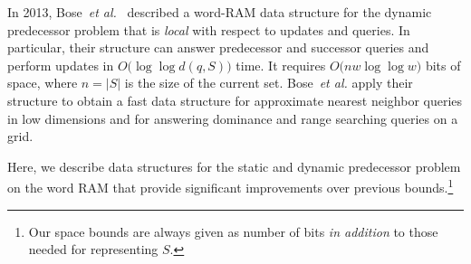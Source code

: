\documentclass[a4paper,11pt]{article}
\newcommand{\etal}{\emph{et al.}\xspace}
\newcommand{\?}{\mskip1.5mu}
\begin{document}
In 2013, Bose~\etal~\cite{BoseDoDuHoMo13} described
a word-RAM data structure for the dynamic predecessor
problem that is \emph{local} with respect to updates
and queries.
In particular, their structure can answer predecessor 
and successor queries and perform updates 
in $O\big(\log\log d(q, S)\big)$ time.
It requires $O\big(n w \log\log w)$ bits 
of space, where $n = |S|$ is the size of the 
current set. Bose~\etal apply their structure 
to obtain a fast data structure for approximate nearest 
neighbor queries in low dimensions and for answering
dominance and range searching queries on a grid.

Here, we describe data structures for the
static and dynamic predecessor problem
on the word RAM that provide significant 
improvements over previous bounds.\footnote{Our 
space bounds are always given as
number of bits \emph{in addition} to those needed for 
representing $S$.} 
\end{document}
